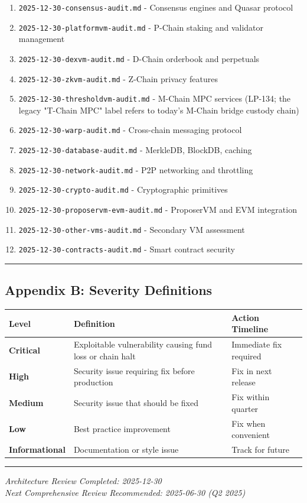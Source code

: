 \documentclass[
]{article}
\newcounter{none} %
\providecommand{\tightlist}{%
  \setlength{\itemsep}{0pt}\setlength{\parskip}{0pt}}
\begin{document}
\begin{enumerate}
\def\labelenumi{\arabic{enumi}.}
\tightlist
\item
  \texttt{2025-12-30-consensus-audit.md} - Consensus engines and Quasar
  protocol
\item
  \texttt{2025-12-30-platformvm-audit.md} - P-Chain staking and
  validator management
\item
  \texttt{2025-12-30-dexvm-audit.md} - D-Chain orderbook and perpetuals
\item
  \texttt{2025-12-30-zkvm-audit.md} - Z-Chain privacy features
\item
  \texttt{2025-12-30-thresholdvm-audit.md} - M-Chain MPC services (LP-134; the legacy "T-Chain MPC" label refers to today's M-Chain bridge custody chain)
\item
  \texttt{2025-12-30-warp-audit.md} - Cross-chain messaging protocol
\item
  \texttt{2025-12-30-database-audit.md} - MerkleDB, BlockDB, caching
\item
  \texttt{2025-12-30-network-audit.md} - P2P networking and throttling
\item
  \texttt{2025-12-30-crypto-audit.md} - Cryptographic primitives
\item
  \texttt{2025-12-30-proposervm-evm-audit.md} - ProposerVM and EVM
  integration
\item
  \texttt{2025-12-30-other-vms-audit.md} - Secondary VM assessment
\item
  \texttt{2025-12-30-contracts-audit.md} - Smart contract security
\end{enumerate}

\begin{center}\rule{0.5\linewidth}{0.5pt}\end{center}

\subsection{Appendix B: Severity
Definitions}\label{appendix-b-severity-definitions}

{\def\LTcaptype{none} %
\begin{longtable}[]{@{}lll@{}}
\toprule\noalign{}
Level & Definition & Action Timeline \\
\midrule\noalign{}
\endhead
\bottomrule\noalign{}
\endlastfoot
\textbf{Critical} & Exploitable vulnerability causing fund loss or chain
halt & Immediate fix required \\
\textbf{High} & Security issue requiring fix before production & Fix in
next release \\
\textbf{Medium} & Security issue that should be fixed & Fix within
quarter \\
\textbf{Low} & Best practice improvement & Fix when convenient \\
\textbf{Informational} & Documentation or style issue & Track for
future \\
\end{longtable}
}

\begin{center}\rule{0.5\linewidth}{0.5pt}\end{center}

\emph{Architecture Review Completed: 2025-12-30}\\
\emph{Next Comprehensive Review Recommended: 2025-06-30 (Q2 2025)}
\end{document}
